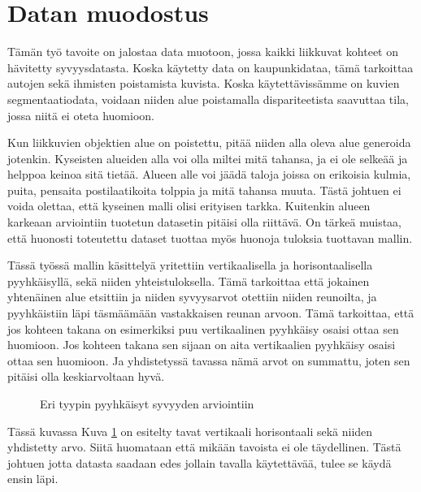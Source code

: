 \section{Datan muodostus}

Tämän työ tavoite on jalostaa data muotoon, jossa kaikki liikkuvat kohteet on hävitetty syvyysdatasta.
Koska käytetty data on kaupunkidataa, tämä tarkoittaa autojen sekä ihmisten poistamista kuvista.
Koska käytettävissämme on kuvien segmentaatiodata, voidaan niiden alue poistamalla dispariteetista saavuttaa tila, jossa niitä ei oteta huomioon.

Kun liikkuvien objektien alue on poistettu, pitää niiden alla oleva alue generoida jotenkin. 
Kyseisten alueiden alla voi olla miltei mitä tahansa, 
ja ei ole selkeää ja helppoa keinoa sitä tietää. 
Alueen alle voi jäädä taloja joissa on erikoisia kulmia, puita, pensaita postilaatikoita tolppia ja mitä tahansa muuta. 
Tästä johtuen ei voida olettaa, että kyseinen malli olisi erityisen tarkka.
Kuitenkin alueen karkeaan arviointiin tuotetun datasetin pitäisi olla riittävä.
On tärkeä muistaa, että huonosti toteutettu dataset tuottaa myös huonoja tuloksia tuottavan mallin.

Tässä työssä mallin käsittelyä yritettiin vertikaalisella ja horisontaalisella pyyhkäisyllä, sekä niiden yhteistuloksella.
Tämä tarkoittaa että jokainen yhtenäinen alue etsittiin ja niiden syvyysarvot otettiin niiden reunoilta,
ja pyyhkäistiin läpi täsmäämään vastakkaisen reunan arvoon.
Tämä tarkoittaa, että jos kohteen takana on esimerkiksi puu vertikaalinen pyyhkäisy osaisi ottaa sen huomioon.
Jos kohteen takana sen sijaan on aita vertikaalien pyyhkäisy osaisi ottaa sen huomioon.
Ja yhdistetyssä tavassa nämä arvot on summattu, joten sen pitäisi olla keskiarvoltaan hyvä. 

\begin{figure}[h]
    \centering
    \caption{Eri tyypin pyyhkäisyt syvyyden arviointiin}
    \label{fig:swipe}
    \end{figure}


Tässä kuvassa Kuva \ref{fig:swipe} on esitelty tavat vertikaali horisontaali sekä niiden yhdistetty arvo. 
Siitä huomataan että mikään tavoista ei ole täydellinen.
Tästä johtuen jotta datasta saadaan edes jollain tavalla käytettävää, tulee se käydä ensin läpi. 

